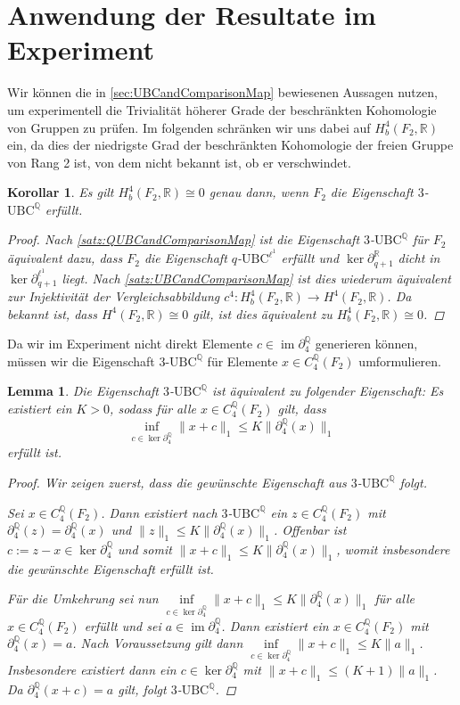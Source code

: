 \documentclass[a4paper,twoside,10pt]{scrreprt}
\DeclareMathOperator{\img}{im}
\newcommand{\Q}{\mathbb{Q}}
\newcommand{\R}{\mathbb{R}}
\newtheorem{lemma}[satz]{Lemma}
\newtheorem{korollar}[satz]{Korollar}
\theoremstyle{definition}
\begin{document}
\section{Anwendung der Resultate im Experiment}
Wir können die in \cref{sec:UBCandComparisonMap} bewiesenen Aussagen nutzen, um experimentell die Trivialität höherer Grade der beschränkten Kohomologie von Gruppen zu prüfen. Im folgenden schränken wir uns dabei auf $H_b^4(F_2,\R)$ ein, da dies der niedrigste Grad der beschränkten Kohomologie der freien Gruppe von Rang 2 ist, von dem nicht bekannt ist, ob er verschwindet.
\begin{korollar} 
Es gilt $H_b^4(F_2,\R)\cong 0$ genau dann, wenn $F_2$ die Eigenschaft $3$-$\text{UBC}^{\Q}$ erfüllt.
\begin{proof}
Nach \cref{satz:QUBCandComparisonMap} ist die Eigenschaft $3$-$\text{UBC}^{\Q}$ für $F_2$ äquivalent dazu, dass $F_2$ die Eigenschaft $q$-$\text{UBC}^{\ell^1}$ erfüllt und $\ker \partial_{q+1}^{\R}$ dicht in $\ker \partial_{q+1}^{\ell^1}$ liegt. Nach \cref{satz:UBCandComparisonMap} ist dies wiederum äquivalent zur Injektivität der Vergleichsabbildung $c^4:H_b^4(F_2,\R)\to H^4(F_2,\R)$. Da bekannt ist, dass $H^4(F_2,\R)\cong 0$ gilt, ist dies äquivalent zu $H_b^4(F_2,\R)\cong 0$.
\end{proof}
\end{korollar}
Da wir im Experiment nicht direkt Elemente $c\in\img\partial_4^{\Q}$ generieren können, müssen wir die Eigenschaft $3$-$\text{UBC}^{\Q}$ für Elemente $x\in C_4^{\Q}(F_2)$ umformulieren. 
\begin{lemma}\label{lem:AltQUBC}
Die Eigenschaft $3$-$\text{UBC}^{\Q}$ ist äquivalent zu folgender Eigenschaft:
Es existiert ein $K>0$, sodass für alle $x\in C_4^{\Q}(F_2)$ gilt, dass 
\begin{equation*}
\inf\limits_{c\in\ker\partial_4^{\Q}}\|x+c\|_1\leq K\|\partial_4^{\Q}(x)\|_1
\end{equation*}
erfüllt ist.
\begin{proof}
Wir zeigen zuerst, dass die gewünschte Eigenschaft aus $3$-$\text{UBC}^{\Q}$ folgt.\par
Sei $x\in C_4^{\Q}(F_2)$. Dann existiert nach $3$-$\text{UBC}^{\Q}$ ein $z\in C_4^{\Q}(F_2)$ mit $\partial_4^{\Q}(z)=\partial_4^{\Q}(x)$ und $\|z\|_1\leq K\|\partial_4^{\Q}(x)\|_1$. Offenbar ist $c:=z-x\in\ker\partial_4^{\Q}$ und somit $\|x+c\|_1\leq K\|\partial_4^{\Q}(x)\|_1$, womit insbesondere die gewünschte Eigenschaft erfüllt ist.\par
Für die Umkehrung sei nun $\inf\limits_{c\in\ker\partial_4^{\Q}}\|x+c\|_1\leq K\|\partial_4^{\Q}(x)\|_1$ für alle $x\in C_4^{\Q}(F_2)$ erfüllt und sei $a\in\img\partial_4^{\Q}$. Dann existiert ein $x\in C_4^{\Q}(F_2)$ mit $\partial_4^{\Q}(x)=a$.
Nach Voraussetzung gilt dann $\inf\limits_{c\in\ker\partial_4^{\Q}}\|x+c\|_1\leq K\|a\|_1$. Insbesondere existiert dann ein $c\in\ker\partial_4^{\Q}$ mit $\|x+c\|_1\leq (K+1)\|a\|_1$. Da $\partial_4^{\Q}(x+c)=a$ gilt, folgt $3$-$\text{UBC}^{\Q}$. 
\end{proof}
\end{lemma}
\end{document}
